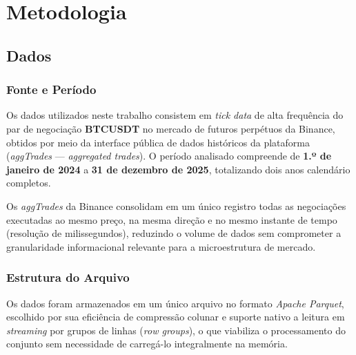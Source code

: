 \chapter{Metodologia}
\label{ch:metodologia}

\section{Dados}
\label{sec:dados}

\subsection{Fonte e Período}
\label{subsec:fonte_periodo}

Os dados utilizados neste trabalho consistem em \textit{tick data} de alta frequência
do par de negociação \textbf{BTCUSDT} no mercado de futuros perpétuos da Binance,
obtidos por meio da interface pública de dados históricos da plataforma
(\textit{aggTrades} — \textit{aggregated trades}).
O período analisado compreende de \textbf{1.º de janeiro de 2024} a
\textbf{31 de dezembro de 2025}, totalizando dois anos calendário completos.

Os \textit{aggTrades} da Binance consolidam em um único registro todas as negociações
executadas ao mesmo preço, na mesma direção e no mesmo instante de tempo
(resolução de milissegundos), reduzindo o volume de dados sem comprometer a
granularidade informacional relevante para a microestrutura de mercado.

\subsection{Estrutura do Arquivo}
\label{subsec:estrutura_arquivo}

Os dados foram armazenados em um único arquivo no formato \textit{Apache Parquet},
escolhido por sua eficiência de compressão colunar e suporte nativo a leitura
em \textit{streaming} por grupos de linhas (\textit{row groups}), o que viabiliza
o processamento do conjunto sem necessidade de carregá-lo integralmente na memória.


